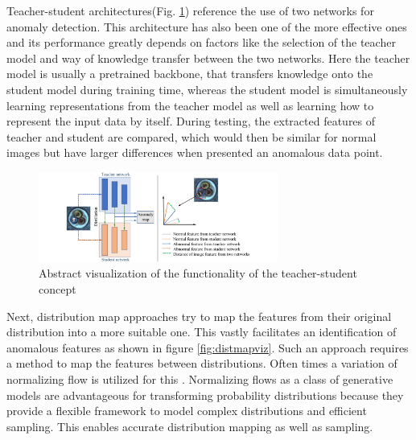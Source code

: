 Teacher-student architectures(Fig. \ref{fig:TSviz}) reference the use of two networks for anomaly detection. 
This architecture has also been one of the more effective ones and its performance greatly depends on factors like the selection of the teacher model and way 
of knowledge transfer between the two networks. Here the teacher model is usually a pretrained 
backbone, that transfers knowledge onto the student model during training time, whereas the student model is simultaneously learning representations from the teacher model as well as learning 
how to represent the input data by itself. During testing, the extracted features of teacher and student are compared, which would then be similar for normal images but have larger differences 
when presented an anomalous data point.\newline


\begin{figure}[H]
    \centering
    \includegraphics[width=0.7\textwidth]{figures/approachvizgeneral/TSviz.jpg}
    \caption{Abstract visualization of the functionality of the teacher-student concept \cite{liu2024deep}}
    \label{fig:TSviz}
\end{figure}



Next, distribution map approaches try to map the features from their original distribution into a more suitable one. This vastly facilitates an identification of anomalous features as shown in 
figure \ref{fig:distmapviz}. Such an approach requires a method to map the features between distributions. Often times a variation of normalizing flow is utilized for this \cite{liu2024deep}. 
Normalizing flows as a class of generative models \cite{Kobyzev_2021normalizingflowexplanation} are advantageous for transforming probability distributions because they provide a flexible 
framework to model complex distributions and efficient sampling. This enables accurate distribution mapping as well as sampling. \newline


